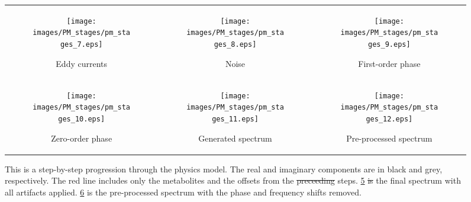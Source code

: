 \documentclass[AMA,LATO1COL]{WileyNJD-v2}
\providecommand{\DIFadd}[1]{{\protect\color{blue}\uwave{#1}}} %
\providecommand{\DIFdel}[1]{{\protect\color{red}\sout{#1}}}                      %
\providecommand{\DIFaddFL}[1]{\DIFadd{#1}} %
\providecommand{\DIFdelFL}[1]{\DIFdel{#1}} %
\providecommand{\DIFaddbeginFL}{} %
\providecommand{\DIFaddendFL}{} %
\providecommand{\DIFdelbeginFL}{} %
\providecommand{\DIFdelendFL}{} %
\begin{document}
\begin{figure}
\begin{tabular}[l]{ccc}
\begin{subfigure}[c]{0.315\textwidth}
        \texttt{[image: images/PM\_stages/pm\_stages\_7.eps]}
        \caption{Eddy currents}
        \label{fig:PM_stages:fshift}\vspace{0.2\baselineskip}
    \end{subfigure}&
    \begin{subfigure}[c]{0.315\textwidth}
        \texttt{[image: images/PM\_stages/pm\_stages\_8.eps]}
        \caption{Noise}
        \label{fig:PM_stages:SNR}\vspace{0.2\baselineskip}
    \end{subfigure}&
    \begin{subfigure}[c]{0.315\textwidth}
        \texttt{[image: images/PM\_stages/pm\_stages\_9.eps]}
        \caption{First-order phase}
        \label{fig:PM_stages:residual water}\vspace{0.2\baselineskip}
    \end{subfigure}\\[25pt]
    \begin{subfigure}[c]{0.315\textwidth}
        \texttt{[image: images/PM\_stages/pm\_stages\_10.eps]}
        \vspace{0.5pt}
        \caption{Zero-order phase}
        \label{fig:PM_stages:baseline}
    \end{subfigure}&
    \begin{subfigure}[c]{0.315\textwidth}
        \texttt{[image: images/PM\_stages/pm\_stages\_11.eps]}
        \vspace{0.5mm}
        \caption{Generated spectrum}
        \label{fig:PM_stages:generated spectrum}
    \end{subfigure}&
    \begin{subfigure}[c]{0.315\textwidth}
        \texttt{[image: images/PM\_stages/pm\_stages\_12.eps]} \smallskip
        \caption{Pre-processed spectrum}
        \label{fig:PM_stages:corrected}
    \end{subfigure}
    \end{tabular}
    \caption{This is a step-by-step progression through the physics model. The real and imaginary components are \DIFaddbeginFL \DIFaddFL{depicted }\DIFaddendFL in black and grey, respectively. The red line includes only the metabolites and the offsets from the \DIFdelbeginFL \DIFdelFL{preceeding }\DIFdelendFL \DIFaddbeginFL \DIFaddFL{preceding }\DIFaddendFL steps. \ref{fig:PM_stages:generated spectrum} \DIFdelbeginFL \DIFdelFL{is }\DIFdelendFL \DIFaddbeginFL \DIFaddFL{shows }\DIFaddendFL the final spectrum with all artifacts applied. \ref{fig:PM_stages:corrected} is the pre-processed spectrum with the phase and frequency shifts removed.}
    \label{fig:PM compilation}
\end{figure}
\end{document}
